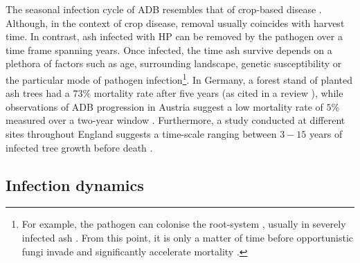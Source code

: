 The seasonal infection cycle of ADB resembles that of crop-based disease \cite{tankam2020modelling}. Although, in the context of crop disease, removal usually coincides with harvest time. In contrast, ash infected with HP can be removed by the pathogen over a time frame spanning years. Once infected, the time ash survive depends on a plethora of factors such as age, surrounding landscape, genetic susceptibility or the particular mode of pathogen infection\footnote{For example, the pathogen can colonise the root-system \cite{schumacher2011general}, usually in severely infected ash \cite{https://doi.org/10.1111/mpp.12073}. From this point, it is only a matter of time before opportunistic fungi invade and significantly accelerate mortality \cite{enderle2013temporal}.}. In Germany, a forest stand of planted ash trees had a $73\%$ mortality rate after five years \cite{langer2015ash} (as cited in a review \cite{enderle2017ash}), while observations of ADB progression in Austria suggest a low mortality rate of $5\%$ measured over a two-year window \cite{kessler2012dieback}. Furthermore, a study conducted at different sites throughout England suggests a time-scale ranging between $3-15$ years of infected tree growth before death \cite{wylder2018evidence}.


\subsection{Infection dynamics}

